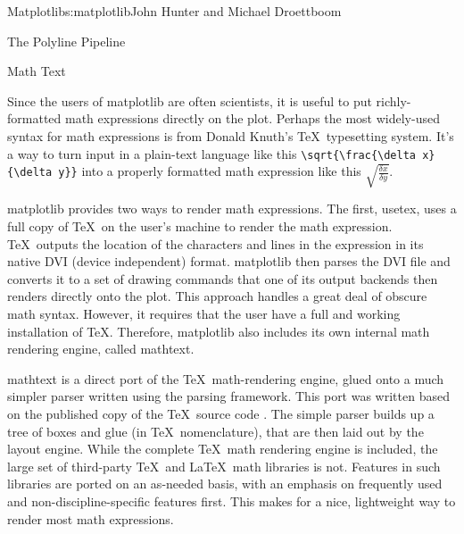 \begin{aosachapter}{Matplotlib}{s:matplotlib}{John Hunter and Michael Droettboom}
\begin{aosasect1}{The Polyline Pipeline}
\begin{aosaenumerate}
\end{aosaenumerate}



\end{aosasect1}

\begin{aosasect1}{Math Text}

Since the users of matplotlib are often scientists, it is useful to
put richly-formatted math expressions directly on the plot.  Perhaps
the most widely-used syntax for math expressions is from Donald
Knuth's \TeX\ typesetting system.  It's a way to turn input in a
plain-text language like this \verb+\sqrt{\frac{\delta x}{\delta y}}+
into a properly formatted math expression like this
$\sqrt{\frac{\delta x}{\delta y}}$.

matplotlib provides two ways to render math expressions.  The first,
usetex, uses a full copy of \TeX\ on the user's machine to render the
math expression.  \TeX\ outputs the location of the characters and
lines in the expression in its native DVI (device independent) format.
matplotlib then parses the DVI file and converts it to a set of
drawing commands that one of its output backends then renders directly
onto the plot.  This approach handles a great deal of obscure math
syntax. However, it requires that the user have a full and working
installation of \TeX.  Therefore, matplotlib also includes its own
internal math rendering engine, called mathtext.

mathtext is a direct port of the \TeX\ math-rendering engine, glued
onto a much simpler parser written using the 
\cite{bib:pyparsing} parsing framework.  This port was written based
on the published copy of the \TeX\ source code \cite{bib:texprogram}.
The simple parser builds up a tree of boxes and glue (in \TeX\
nomenclature), that are then laid out by the layout engine.  While the
complete \TeX\ math rendering engine is included, the large set of
third-party \TeX\ and \LaTeX\ math libraries is not.  Features in such
libraries are ported on an as-needed basis, with an emphasis on
frequently used and non-discipline-specific features first.  This
makes for a nice, lightweight way to render most math expressions.


\end{aosasect1}
\end{aosachapter}
